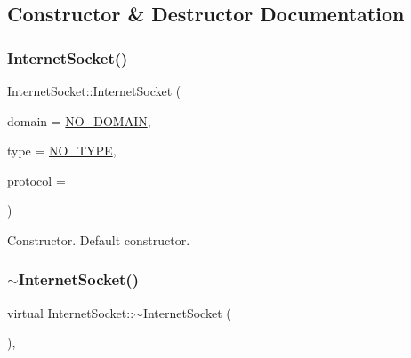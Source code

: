 \subsection{Constructor \& Destructor Documentation}
\mbox{\label{classInternetSocket_afcbe1350ae9e2c4f256c986a371952ac}} 
\subsubsection{\texorpdfstring{Internet\+Socket()}{InternetSocket()}\hspace{0.1cm}{\footnotesize\ttfamily [1/2]}}
{\footnotesize\ttfamily Internet\+Socket\+::\+Internet\+Socket (\begin{DoxyParamCaption}\item[{\hyperlink{classSocketClass_ac940413abaa7328db8518a9f121babb6}{Sock\+Domain}}]{domain = {\ttfamily \hyperlink{classSocketClass_ac940413abaa7328db8518a9f121babb6aa9ec2a4d642c47813fe90f362603f1c4}{N\+O\+\_\+\+D\+O\+M\+A\+IN}},  }\item[{\hyperlink{classSocketClass_a2182dd9fee09459fabb99e6ae717f595}{Sock\+Type}}]{type = {\ttfamily \hyperlink{classSocketClass_a2182dd9fee09459fabb99e6ae717f595a8c7f955ea5b71498ff1d469345d813ad}{N\+O\+\_\+\+T\+Y\+PE}},  }\item[{int}]{protocol = {} }\end{DoxyParamCaption})\hspace{0.3cm}{\ttfamily [inline]}}

Constructor. Default constructor. \mbox{\label{classInternetSocket_aa05d862f91ae89c523f30c8af75e4bae}} 
\subsubsection{\texorpdfstring{$\sim$\+Internet\+Socket()}{~InternetSocket()}}
{\footnotesize\ttfamily virtual Internet\+Socket\+::$\sim$\+Internet\+Socket (\begin{DoxyParamCaption}{ }\end{DoxyParamCaption})\hspace{0.3cm}{\ttfamily [inline]}, {\ttfamily [virtual]}}



